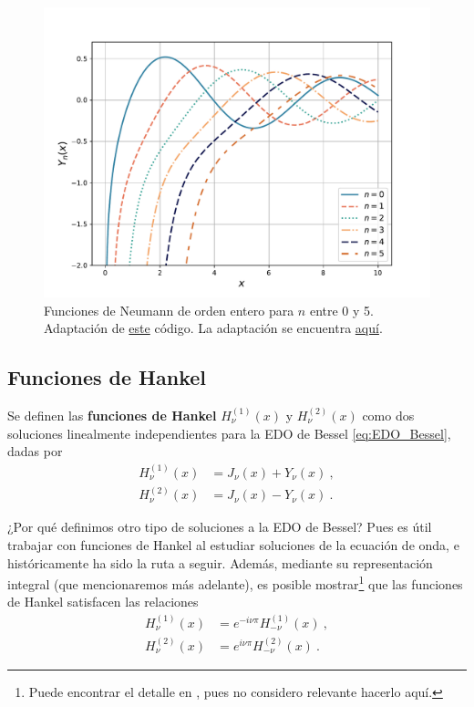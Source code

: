 \begin{figure}
    \centering
    \includegraphics[width = 12cm]{Figuras/Bessel_second_kind.pdf}
    \caption{Funciones de Neumann de orden entero para $n$ entre 0 y 5. Adaptación de \href{https://github.com/gfrubi/FM2/blob/master/figuras-editables/fig-Bessel.py}{este} código. La adaptación se encuentra \href{aa}{aquí}.}
    \label{fig:Bessel_segunda_especie}
\end{figure}

\newpage

\subsection{Funciones de Hankel}

\begin{defi} 
    Se definen las \textbf{funciones de Hankel} $H_\nu^{(1)}(x)$ y $H_\nu^{(2)}(x)$ como dos soluciones linealmente independientes para la EDO de Bessel \eqref{eq:EDO_Bessel}, dadas por
    \begin{align}
        H_\nu^{(1)}(x) & = J_\nu(x) + Y_\nu(x) \ , \\
        H_\nu^{(2)}(x) & = J_\nu(x) - Y_\nu(x) \ .
    \end{align}
\end{defi}

¿Por qué definimos otro tipo de soluciones a la EDO de Bessel? Pues es útil trabajar con funciones de Hankel al estudiar soluciones de la ecuación de onda, e históricamente ha sido la ruta a seguir. Además, mediante su representación integral (que mencionaremos más adelante), es posible mostrar\footnote{Puede encontrar el detalle en \cite{Arfken}, pues no considero relevante hacerlo aquí.} que las funciones de Hankel satisfacen las relaciones
\begin{align}
    H_\nu^{(1)}(x) & = e^{-i\nu\pi} H_{-\nu}^{(1)}(x) \ , \\
    H_\nu^{(2)}(x) & = e^{i\nu\pi} H_{-\nu}^{(2)}(x) \ .
\end{align}

